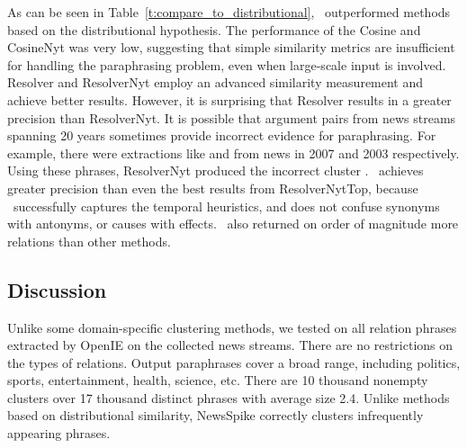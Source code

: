 As can be seen in Table~\ref{t:compare_to_distributional}, \sys\ outperformed
methods based on the distributional hypothesis. The performance of the Cosine
and CosineNyt was very low, suggesting that simple similarity metrics are
insufficient for handling the paraphrasing problem, even when large-scale
input is involved. Resolver and ResolverNyt employ an advanced similarity
measurement and achieve better results. However, it is surprising that Resolver
results in a greater precision than ResolverNyt. It is possible that argument
pairs from news streams spanning 20 years sometimes provide incorrect evidence
for paraphrasing. For example, there were extractions like  and  from news in
2007 and 2003 respectively. Using these phrases, ResolverNyt produced the
incorrect cluster . \sys\ achieves greater
precision than even the best results from ResolverNytTop, because \sys\
successfully captures the temporal heuristics, and does not confuse
synonyms with antonyms, or causes with effects.  \sys\ also returned on
order of magnitude more relations than other
methods.



\subsection{Discussion}
Unlike some domain-specific clustering methods, we tested on all relation
phrases extracted by OpenIE on the collected news streams. There are no
restrictions on the types of relations. Output paraphrases cover a broad range,
including politics, sports, entertainment, health, science, etc. 
There are 10 thousand nonempty clusters over 17 thousand distinct phrases with
average size 2.4. Unlike methods based on distributional similarity,
NewsSpike correctly clusters infrequently appearing phrases.

